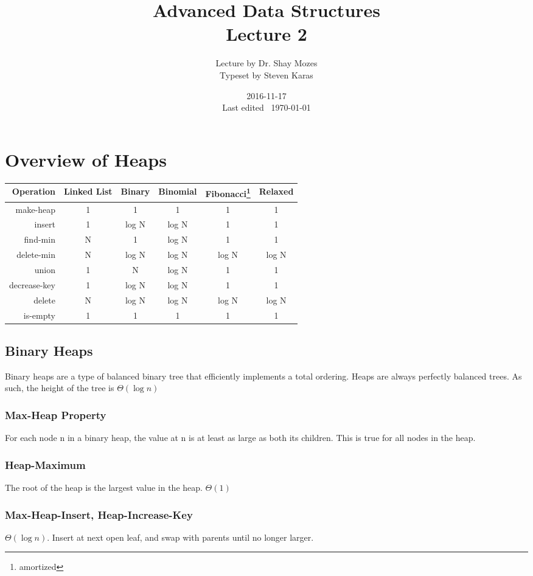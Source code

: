 \documentclass[a4paper]{article}
\title{Advanced Data Structures\\\large Lecture 2}
\date{2016-11-17 \\ Last edited \currenttime\ \today}
\author{Lecture by Dr. Shay Mozes\\Typeset by Steven Karas}
\begin{document}
\maketitle

\section{Overview of Heaps}

\begin{tabu} to \linewidth{|r|c|c|c|c|c|}
\hline
Operation & Linked List & Binary & Binomial & Fibonacci\footnote{amortized} & Relaxed \\
\hline
make-heap & 1 & 1 & 1 & 1 & 1 \\
\hline
insert & 1 & log N & log N & 1 & 1 \\
\hline
find-min & N & 1 & log N & 1 & 1 \\
\hline
delete-min & N & log N & log N & log N & log N \\
\hline
union & 1 & N & log N\footnotemark[1] & 1 & 1 \\
\hline
decrease-key & 1 & log N & log N & 1 & 1 \\
\hline
delete & N & log N & log N & log N & log N \\
\hline
is-empty & 1 & 1 & 1 & 1 & 1 \\
\hline
\end{tabu}

\subsection{Binary Heaps}
Binary heaps are a type of balanced binary tree that efficiently implements a total ordering. Heaps are always perfectly balanced trees. As such, the height of the tree is $\Theta(\log n)$

\subsubsection{Max-Heap Property}
For each node n in a binary heap, the value at n is at least as large as both its children. This is true for all nodes in the heap.

\subsubsection{Heap-Maximum}
The root of the heap is the largest value in the heap. $\Theta(1)$

\subsubsection{Max-Heap-Insert, Heap-Increase-Key}
$\Theta(\log n)$. Insert at next open leaf, and swap with parents until no longer larger.
\end{document}
